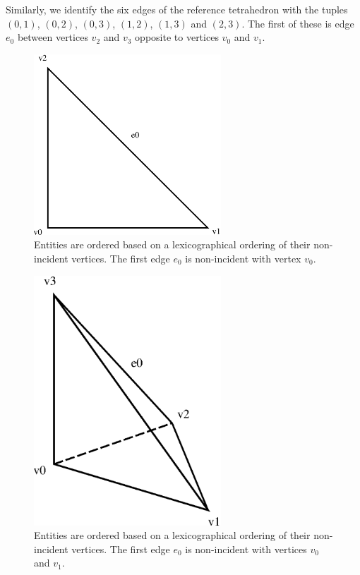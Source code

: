 Similarly, we identify the six edges of the reference tetrahedron with
the tuples $(0, 1)$, $(0, 2)$, $(0, 3)$, $(1, 2)$, $(1, 3)$ and
$(2, 3)$. The first of these is edge $e_0$ between vertices $v_2$ and
$v_3$ opposite to vertices $v_0$ and $v_1$.

\begin{figure}[H]
  \begin{center}
    \includegraphics[width=7cm]{eps/ordering_example_triangle.eps}
    \caption{Entities are ordered based on a lexicographical ordering
      of their non-incident vertices. The first edge $e_0$ is non-incident
      with vertex $v_0$.}
    \label{fig:orderingexample}
  \end{center}
\end{figure}

\begin{figure}[H]
  \begin{center}
    \includegraphics[width=7cm]{eps/ordering_example_tetrahedron.eps}
    \caption{Entities are ordered based on a lexicographical ordering
      of their non-incident vertices. The first edge $e_0$ is non-incident
      with vertices $v_0$ and $v_1$.}
    \label{fig:orderingexample}
  \end{center}
\end{figure}

